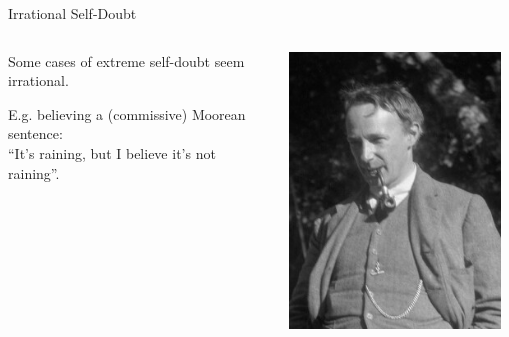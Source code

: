 \documentclass[aspectratio=169, dvipsnames]{beamer}
\begin{document}
\begin{frame}{Irrational Self-Doubt}
  \begin{columns}
    \begin{column}{.69\linewidth}
      Some cases of extreme self-doubt seem irrational.
      \vspace{20pt}
      
      E.g. believing a (commissive) \alert{Moorean sentence}:\\
      ``It's raining, but I believe it's not raining''.\\
    \end{column}
    \begin{column}{.3\linewidth}
      \begin{center}
      \includegraphics[width=0.95\textwidth]{GEMoore.jpg}
      \end{center}
    \end{column}
  \end{columns}
\end{frame}
\end{document}
